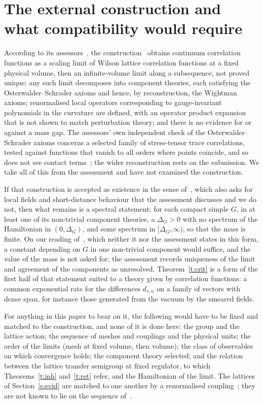 \section{The external construction and what compatibility would require}\label{s:ext}
According to its assessors~\cite[pp.~1, 3]{YMG}, the construction~\cite{OAI} obtains continuum correlation
functions as a scaling limit of Wilson lattice correlation functions at a fixed physical volume, then an
infinite-volume limit along a subsequence, not proved unique; any such limit decomposes into component
theories, each satisfying the Osterwalder--Schrader axioms and hence, by reconstruction, the Wightman axioms;
renormalised local operators corresponding to gauge-invariant polynomials in the curvature are defined, with
an operator product expansion that is not shown to match perturbation theory; and there is no evidence for or
against a mass gap. The assessors' own independent check of the Osterwalder--Schrader axioms concerns a
selected family of stress-tensor trace correlations, tested against functions that vanish to all orders where
points coincide, and so does not see contact terms~\cite[Part~II]{YMG}; the wider reconstruction rests on
the submission. We take all of this from the assessment and have not examined the construction.

If that construction is accepted as existence in the sense of~\cite{JW}, which also asks for local fields and
short-distance behaviour that the assessment discusses and we do not, then what remains is a spectral
statement: for each compact simple $G$, in at least one of its non-trivial component theories, a $\Delta_G>0$
with no spectrum of the Hamiltonian in $(0,\Delta_G)$, and some spectrum in $[\Delta_G,\infty)$, so that the mass is finite.
On our reading of~\cite{JW}, which neither it nor the assessment states in this form, a constant depending
on $G$ in one non-trivial component would suffice, and the value of the mass is not asked for; the
assessment records uniqueness of the limit and agreement of the components as unresolved. Theorem~\ref{t:crit} is a form of the first half of that statement suited to a
theory given by correlation functions: a common exponential rate for the differences $d_{v,n}$ on a family of
vectors with dense span, for instance those generated from the vacuum by the smeared fields.

For anything in this paper to bear on it, the following would have to be fixed and matched to the
construction, and none of it is done here: the group and the lattice action; the sequence of meshes and
couplings and the physical units; the order of the limits (mesh at fixed volume, then volume); the class of
observables on which convergence holds; the component theory selected; and the relation between the lattice
transfer semigroup at fixed regulator, to which Theorems~\ref{t:inh} and~\ref{t:ret} refer, and the
Hamiltonian of the limit. The lattices of Section~\ref{s:evid} are matched to one another by a renormalised
coupling~\cite{RepoData}; they are not known to lie on the sequence of~\cite{OAI}.


